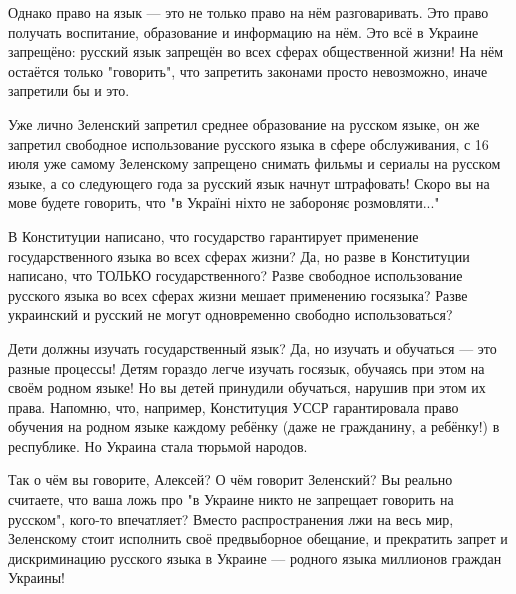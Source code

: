 Однако право на язык — это не только право на нём разговаривать. Это право
получать воспитание, образование и информацию на нём. Это всё в Украине
запрещёно: русский язык запрещён во всех сферах общественной жизни! На нём
остаётся только "говорить", что запретить законами просто невозможно, иначе
запретили бы и это. 

Уже лично Зеленский запретил среднее образование на русском языке, он же
запретил свободное использование русского языка в сфере обслуживания, с 16 июля
уже самому Зеленскому запрещено снимать фильмы и сериалы на русском языке, а со
следующего года за русский язык начнут штрафовать! Скоро вы на мове будете
говорить, что "в Україні ніхто не забороняє розмовляти..." 

В Конституции написано, что государство гарантирует применение государственного
языка во всех сферах жизни? Да, но разве в Конституции написано, что ТОЛЬКО
государственного? Разве свободное использование русского языка во всех сферах
жизни мешает применению госязыка? Разве украинский и русский не могут
одновременно свободно использоваться?

Дети должны изучать государственный язык? Да, но изучать и обучаться — это
разные процессы! Детям гораздо легче изучать госязык, обучаясь при этом на
своём родном языке! Но вы детей принудили обучаться, нарушив при этом их права.
Напомню, что, например, Конституция УССР гарантировала право обучения на родном
языке каждому ребёнку (даже не гражданину, а ребёнку!) в республике. Но Украина
стала тюрьмой народов.

Так о чём вы говорите, Алексей? О чём говорит Зеленский? Вы реально считаете,
что ваша ложь про "в Украине никто не запрещает говорить на русском", кого-то
впечатляет? Вместо распространения лжи на весь мир, Зеленскому стоит исполнить
своё предвыборное обещание, и прекратить запрет и дискриминацию русского языка
в Украине — родного языка миллионов граждан Украины!


